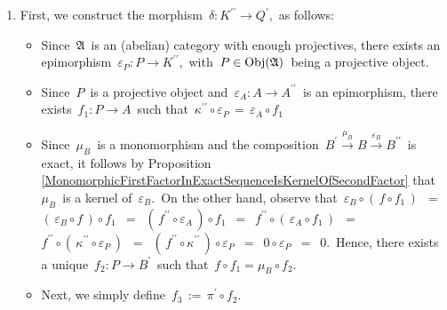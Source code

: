 \begin{enumerate}
\item
	First, we construct the morphism \,$\delta : K^{\prime\prime} \longrightarrow Q^{\prime}$,\, as follows:
	\begin{itemize}
	\item
		Since \,$\mathfrak{A}$\, is an (abelian) category with enough projectives,
		there exists an epimorphism
		\,$\varepsilon_{P} : P \longrightarrow K^{\prime\prime}$,\,
		with \,$P \in \textnormal{Obj}(\mathfrak{A})$\, being a projective object.
	\item
		Since \,$P$\, is a projective object and 
		\,$\varepsilon_{A} : A \longrightarrow A^{\prime\prime}$\,
		is an epimorphism, there exists
		\,$f_{1} : P \longrightarrow A$\,
		such that
		\,$\kappa^{\prime\prime} \circ \varepsilon_{P} \,=\, \varepsilon_{A} \circ f_{1}$\,
	\item
		Since \,$\mu_{B}$\, is a monomorphism
		and the composition
		\,$B^{\prime} \overset{\mu_{B}}{\longrightarrow} B \overset{\varepsilon_{B}}{\longrightarrow} B^{\prime\prime}$\,
		is exact, it follows
		by Proposition \ref{MonomorphicFirstFactorInExactSequenceIsKernelOfSecondFactor}
		that
		\,$\mu_{B}$\, is a kernel of \,$\varepsilon_{B}$.\,
		On the other hand, observe that
		\,$\varepsilon_{B} \circ (\,f \circ f_{1}\,)$
		\,$=$\, $(\,\varepsilon_{B} \circ f\,) \circ f_{1}$
		\,$=$\, $(\,f^{\prime\prime} \circ \varepsilon_{A}\,) \circ f_{1}$
		\,$=$\, $f^{\prime\prime} \circ (\,\varepsilon_{A} \circ f_{1}\,)$
		\,$=$\, $f^{\prime\prime} \circ (\,\kappa^{\prime\prime} \circ \varepsilon_{P}\,)$
		\,$=$\, $(\,f^{\prime\prime} \circ \kappa^{\prime\prime}\,) \circ \varepsilon_{P}$
		\,$=$\, $0 \circ \varepsilon_{P}$
		\,$=$\, $0$.\,
		Hence, there exists a unique
		\,$f_{2} : P \longrightarrow B^{\prime}$\,
		such that
		\,$f \circ f_{1} = \mu_{B} \circ f_{2}$.\,
	\item
		Next, we simply define
		\,$f_{3} \,:=\, \pi^{\prime} \circ f_{2}$.\,
	\end{itemize}

\end{enumerate}
